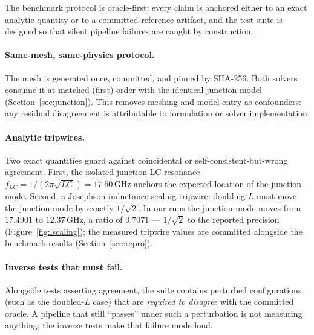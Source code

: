 \documentclass{anvil-paper}
\begin{document}
The benchmark protocol is oracle-first: every claim is anchored either to
an exact analytic quantity or to a committed reference artifact, and the
test suite is designed so that silent pipeline failures are caught by
construction.

\paragraph{Same-mesh, same-physics protocol.}
The mesh is generated once, committed, and pinned by SHA-256. Both solvers
consume it at matched (first) order with the identical junction model
(Section~\ref{sec:junction}). This removes meshing and model entry as
confounders: any residual disagreement is attributable to formulation or
solver implementation.

\paragraph{Analytic tripwires.}
Two exact quantities guard against coincidental or self-consistent-but-wrong
agreement. First, the isolated junction LC resonance
$f_{LC} = 1/(2\pi\sqrt{LC}) = 17.60$\,GHz anchors the expected location of
the junction mode. Second, a Josephson inductance-scaling tripwire: doubling
$L$ must move the junction mode by exactly $1/\sqrt{2}$. In our runs the
junction mode moves from $17.4901$ to $12.37$\,GHz, a ratio of $0.7071$ ---
$1/\sqrt{2}$ to the reported precision (Figure~\ref{fig:lscaling}); the
measured tripwire values are committed alongside the benchmark results
(Section~\ref{sec:repro}).

\paragraph{Inverse tests that must fail.}
Alongside tests asserting agreement, the suite contains perturbed
configurations (such as the doubled-$L$ case) that are \emph{required to
disagree} with the committed oracle. A pipeline that still ``passes'' under
such a perturbation is not measuring anything; the inverse tests make that
failure mode loud.
\end{document}
